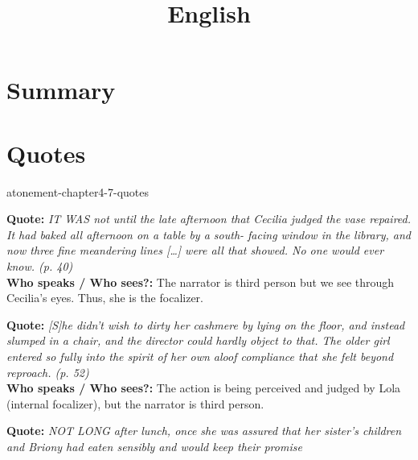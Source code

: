 \documentclass[preview]{standalone}
\begin{document}
\title{English}
\genpage

\section{Summary}

\section{Quotes}

\begin{snippet}{atonement-chapter4-7-quotes}
\begin{minipage}[l]{0.05\textwidth}
\end{minipage}
\begin{minipage}[r]{0.95\textwidth}
    \textbf{Quote:} \textit{
        IT WAS not until the late afternoon that
        Cecilia judged the vase repaired. It had
        baked all afternoon on a table by a south-
        facing window in the library, and now three
        fine meandering lines […] were all that
        showed. No one would ever know. (p. 40)
    }
    \\
    \textbf{Who speaks / Who sees?:}
    The narrator is third person but we see through Cecilia's eyes.
    Thus, she is the focalizer.
\end{minipage}
\hr
\begin{minipage}[l]{0.05\textwidth}
\end{minipage}
\begin{minipage}[r]{0.95\textwidth}
    \textbf{Quote:} \textit{
        [S]he didn't wish to dirty her cashmere by
        lying on the floor, and instead slumped in a
        chair, and the director could hardly object to
        that. The older girl entered so fully into the
        spirit of her own aloof compliance that she
        felt beyond reproach. (p. 52)
    }
    \\
    \textbf{Who speaks / Who sees?:}
    The action is being perceived and judged by Lola (internal focalizer),
    but the narrator is third person.
\end{minipage}
\hr
\begin{minipage}[l]{0.05\textwidth}
\end{minipage}
\begin{minipage}[r]{0.95\textwidth}
    \textbf{Quote:} \textit{
        NOT LONG after lunch, once she was assured
        that her sister's children and Briony had
        eaten sensibly and would keep their promise
}
\end{minipage}
\end{snippet}
\end{document}
